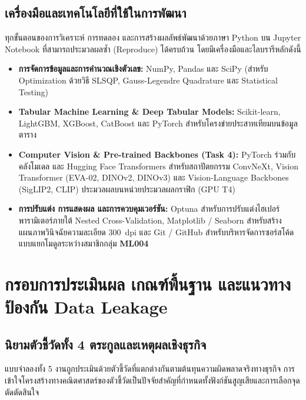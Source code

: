 \documentclass[11pt,a4paper]{article}
\DeclareRobustCommand{\code}[1]{\leavevmode{\ttfamily\color{KeyGreen!85!black}\let\codeunderscore\_\def\_{\codeunderscore\allowbreak}\hyphenpenalty=50\exhyphenpenalty=50\relax#1}}
\begin{document}
\subsection{เครื่องมือและเทคโนโลยีที่ใช้ในการพัฒนา}

ทุกขั้นตอนของการวิเคราะห์ การทดลอง และการสร้างผลลัพธ์พัฒนาด้วยภาษา Python บน Jupyter Notebook ที่สามารถประมวลผลซ้ำ (Reproduce) ได้ครบถ้วน โดยมีเครื่องมือและไลบรารีหลักดังนี้
\begin{itemize}
    \item \textbf{การจัดการข้อมูลและการคำนวณเชิงตัวเลข:} NumPy, Pandas และ SciPy (สำหรับ Optimization ด้วยวิธี SLSQP, Gauss-Legendre Quadrature และ Statistical Testing)
    \item \textbf{Tabular Machine Learning \& Deep Tabular Models:} Scikit-learn, LightGBM, XGBoost, CatBoost และ PyTorch สำหรับโครงข่ายประสาทเทียมบนข้อมูลตาราง
    \item \textbf{Computer Vision \& Pre-trained Backbones (Task 4):} PyTorch ร่วมกับคลังโมเดล \code{timm} และ Hugging Face Transformers สำหรับสถาปัตยกรรม ConvNeXt, Vision Transformer (EVA-02, DINOv2, DINOv3) และ Vision-Language Backbones (SigLIP2, CLIP) ประมวลผลบนหน่วยประมวลผลกราฟิก (GPU T4)
    \item \textbf{การปรับแต่ง การแสดงผล และการควบคุมเวอร์ชัน:} Optuna สำหรับการปรับแต่งไฮเปอร์พารามิเตอร์ภายใต้ Nested Cross-Validation, Matplotlib / Seaborn สำหรับสร้างแผนภาพวินิจฉัยความละเอียด 300~dpi และ Git / GitHub สำหรับบริหารจัดการซอร์สโค้ดแบบแยกโมดูลระหว่างสมาชิกกลุ่ม \textbf{ML004}
\end{itemize}

\clearpage
\section{กรอบการประเมินผล เกณฑ์พื้นฐาน และแนวทางป้องกัน Data Leakage}

\subsection{นิยามตัวชี้วัดทั้ง 4 ตระกูลและเหตุผลเชิงธุรกิจ}

แบบจำลองทั้ง 5 งานถูกประเมินด้วยตัวชี้วัดที่แตกต่างกันตามต้นทุนความผิดพลาดจริงทางธุรกิจ การเข้าใจโครงสร้างทางคณิตศาสตร์ของตัวชี้วัดเป็นปัจจัยสำคัญที่กำหนดทั้งฟังก์ชันสูญเสียและการเลือกจุดตัดตัดสินใจ
\end{document}
